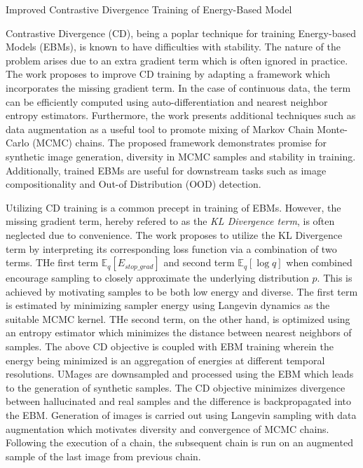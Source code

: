 \documentclass[11pt,letterpaper]{article}
\begin{document}
\begin{center}
  \large{Improved Contrastive Divergence Training of Energy-Based Model}
\end{center}

Contrastive Divergence (CD), being a poplar technique for training Energy-based Models (EBMs), is known to have difficulties with stability. The nature of the problem arises due to an extra gradient term which is often ignored in practice. The work proposes to improve CD training by adapting a framework which incorporates the missing gradient term. In the case of continuous data, the term can be efficiently computed using auto-differentiation and nearest neighbor entropy estimators. Furthermore, the work presents additional techniques such as data augmentation as a useful tool to promote mixing of Markov Chain Monte-Carlo (MCMC) chains. The proposed framework demonstrates promise for synthetic image generation, diversity in MCMC samples and stability in training. Additionally, trained EBMs are useful for downstream tasks such as image compositionality and Out-of Distribution (OOD) detection.

Utilizing CD training is a common precept in training of EBMs. However, the missing gradient term, hereby refered to as the \textit{KL Divergence term}, is often neglected due to convenience. The work proposes to utilize the KL Divergence term by interpreting its corresponding loss function via a combination of two terms. THe first term $\mathbb{E}_{q}[E_{stop\_grad}]$ and second term $\mathbb{E}_{q}[\log q]$ when combined encourage sampling to closely approximate the underlying distribution $p$. This is achieved by motivating samples to be both low energy and diverse. The first term is estimated by minimizing sampler energy using Langevin dynamics as the suitable MCMC kernel. THe second term, on the other hand, is optimized using an entropy estimator which minimizes the distance between nearest neighbors of samples. The above CD objective is coupled with EBM training wherein the energy being minimized is an aggregation of energies at different temporal resolutions. UMages are downsampled and processed using the EBM which leads to the generation of synthetic samples. The CD objective minimizes divergence between hallucinated and real samples and the difference is backpropagated into the EBM. Generation of images is carried out using Langevin sampling with data augmentation which motivates diversity and convergence of MCMC chains. Following the execution of a chain, the subsequent chain is run on an augmented sample of the last image from previous chain.
\end{document}
